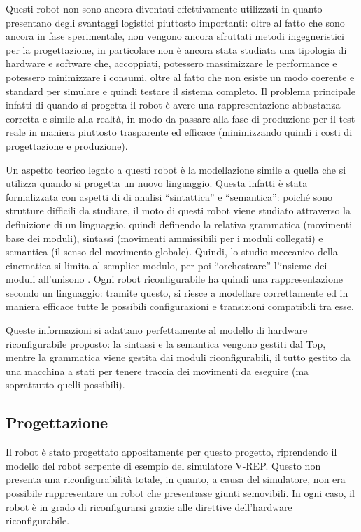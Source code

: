 \documentclass[a4paper,titlepage]{book}
\begin{document}
Questi robot non sono ancora diventati effettivamente utilizzati in quanto presentano degli svantaggi logistici piuttosto importanti: oltre al fatto che sono ancora in fase sperimentale, non vengono ancora sfruttati metodi ingegneristici per la progettazione, in particolare non è ancora stata studiata una tipologia di hardware e software che, accoppiati, potessero massimizzare le performance e potessero minimizzare i consumi, oltre al fatto che non esiste un modo coerente e standard per simulare e quindi testare il sistema completo.
Il problema principale infatti di quando si progetta il robot è avere una rappresentazione abbastanza corretta e simile alla realtà, in modo da passare alla fase di produzione per il test reale in maniera piuttosto trasparente ed efficace (minimizzando quindi i costi di progettazione e produzione).

Un aspetto teorico legato a questi robot è la modellazione simile a quella che si utilizza quando si progetta un nuovo linguaggio. Questa infatti è stata formalizzata con aspetti di di analisi ``sintattica'' e ``semantica'': poiché sono strutture difficili da studiare, il moto di questi robot viene studiato attraverso la definizione di un linguaggio, quindi definendo la relativa grammatica (movimenti base dei moduli), sintassi (movimenti ammissibili per i moduli collegati) e semantica (il senso del movimento globale). Quindi, lo studio meccanico della cinematica si limita al semplice modulo, per poi ``orchestrare'' l'insieme dei moduli all'unisono \cite{robot_syntax}.
Ogni robot riconfigurabile ha quindi una rappresentazione secondo un linguaggio: tramite questo, si riesce a modellare correttamente ed in maniera efficace tutte le possibili configurazioni e transizioni compatibili tra esse.

Queste informazioni si adattano perfettamente al modello di hardware riconfigurabile proposto: la sintassi e la semantica vengono gestiti dal Top, mentre la grammatica viene gestita dai moduli riconfigurabili, il tutto gestito da una macchina a stati per tenere traccia dei movimenti da eseguire (ma soprattutto quelli possibili).

\subsection{Progettazione}

Il robot è stato progettato appositamente per questo progetto, riprendendo il modello del robot serpente di esempio del simulatore V-REP. Questo non presenta una riconfigurabilità totale, in quanto, a causa del simulatore, non era possibile rappresentare un robot che presentasse giunti semovibili. In ogni caso, il robot è in grado di riconfigurarsi grazie alle direttive dell'hardware riconfigurabile.
\end{document}
